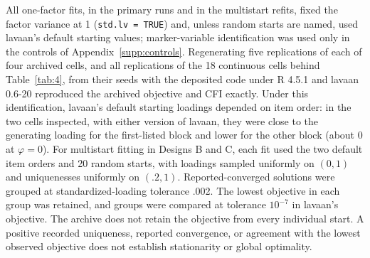 All one-factor fits, in the primary runs and in the multistart refits, fixed the factor variance at 1 (\texttt{std.lv = TRUE}) and, unless random starts are named, used lavaan's default starting values; marker-variable identification was used only in the controls of Appendix~\ref{supp:controls}. Regenerating five replications of each of four archived cells, and all replications of the 18 continuous cells behind Table~\ref{tab:4}, from their seeds with the deposited code under R 4.5.1 and lavaan 0.6-20 reproduced the archived objective and CFI exactly. Under this identification, lavaan's default starting loadings depended on item order: in the two cells inspected, with either version of lavaan, they were close to the generating loading for the first-listed block and lower for the other block (about 0 at $\varphi=0$). For multistart fitting in Designs B and C, each fit used the two default item orders and 20 random starts, with loadings sampled uniformly on $(0,1)$ and uniquenesses uniformly on $(.2,1)$. Reported-converged solutions were grouped at standardized-loading tolerance .002. The lowest objective in each group was retained, and groups were compared at tolerance $10^{-7}$ in lavaan's objective. The archive does not retain the objective from every individual start. A positive recorded uniqueness, reported convergence, or agreement with the lowest observed objective does not establish stationarity or global optimality.

